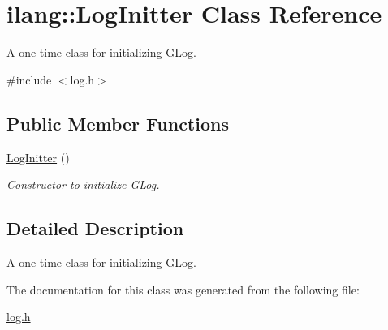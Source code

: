 \hypertarget{classilang_1_1_log_initter}{}\section{ilang\+:\+:Log\+Initter Class Reference}
\label{classilang_1_1_log_initter}


A one-\/time class for initializing G\+Log.  




{\ttfamily \#include $<$log.\+h$>$}

\subsection*{Public Member Functions}
\begin{DoxyCompactItemize}
\item 
\mbox{\label{classilang_1_1_log_initter_a98c7b1af8d0e80e0128ad49892f507ae}} 
\mbox{\hyperlink{classilang_1_1_log_initter_a98c7b1af8d0e80e0128ad49892f507ae}{Log\+Initter}} ()
\begin{DoxyCompactList}\small\item\em Constructor to initialize G\+Log. \end{DoxyCompactList}\end{DoxyCompactItemize}


\subsection{Detailed Description}
A one-\/time class for initializing G\+Log. 

The documentation for this class was generated from the following file\+:\begin{DoxyCompactItemize}
\item 
\mbox{\hyperlink{log_8h}{log.\+h}}\end{DoxyCompactItemize}
